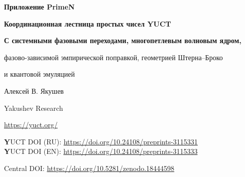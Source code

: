 \documentclass[12pt,a4paper]{article}
\newcommand{\kappac}{\kappa_c}
\newcommand{\Seven}{S_{\mathrm{even}}}
\begin{document}
	
	\begin{titlepage}
		\centering
		\vspace*{0cm}
		
		{\Huge\bfseries Приложение PrimeN\par}
		\vspace{0.5cm}
		{\Large\bfseries Координационная лестница простых чисел YUCT\par}
		\vspace{0.3cm}
		{\Large\bfseries С системными фазовыми переходами, многопетлевым волновым ядром,\par
			фазово-зависимой эмпирической поправкой, геометрией Штерна–Броко\par
			и квантовой эмуляцией\par}
		\vspace{1.0cm}
		
		{\large Алексей В. Якушев\par}
		\vspace{0.3cm}
		{\normalsize Yakushev Research\par}
		{\normalsize \url{https://yuct.org/}\par}
		
		\vspace{2cm}
		\large 
		\textbf YUCT DOI (RU): \url{https://doi.org/10.24108/preprints-3115331} \\
		\textbf YUCT DOI (EN): \url{https://doi.org/10.24108/preprints-3115333}
		
		\vspace{1cm}
		
		\vspace{0cm}
		\small
		Central DOI: \url{https://doi.org/10.5281/zenodo.18444598}\\
		
		\vfill
		\newpage
		\begin{abstract}
			\noindent
			Мы устанавливаем строгую связь между распределением простых чисел и Объединённой теорией координации Якушева (YUCT). Универсальный закон ошибок \(\varepsilon = \kappac \alpha K_{\mathrm{eff}}^{-\beta}\) (\(\beta=2/3\), \(\kappac=1/3\)) управляет асимптотическими флуктуациями \(n\)-го простого числа \(p_n\) вокруг классического приближения Россера. Из алгебраической петли YUCT мы выводим \textbf{теоретическую поправку} \(p_n \approx R_n - \frac{\Seven}{2}\, n^{1-\beta}\,\ln n\), которая \textbf{не содержит свободных параметров} и даёт асимптотически точное описание гладкого тренда отклонений простых чисел (Теорема~4).
			
			\textbf{Новое в этой версии:} Мы обнаруживаем и математически выводим \textbf{каскадные фазовые переходы} вакуумной решётки, которые проявляются как инверсии знака поправки первого порядка при критических индексах \(N_f = 80,\,96.5,\,113,\,\dots\) с шагом \(\Delta N = 16.5\), выведенным непосредственно из числа фермионов Вейля \(L_0 = 96\) и инварианта чётного сектора \(\Seven = 0.8\). Непрерывный тригонометрический фазовый оператор заменяет ручные пороги, гарантируя правильный выбор знака на любых масштабах.
			

\end{abstract}
\end{titlepage}
\end{document}
